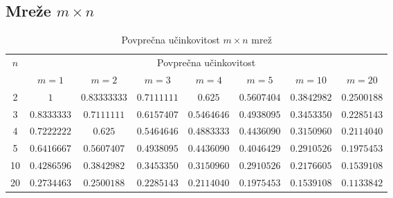\documentclass[a4paper, 16pt]{article}
\begin{document}
    \subsection{Mreže $m \times n$}
    

    \begin{table}[!h]
        \centering
        \begin{tabular}{c|c|c|c|c|c|c|c}
            \multirow{2}{*}{$n$} & 
            \multicolumn{7}{c}{Povprečna učinkovitost}\\
               & $m=1$       & $m=2$           & $m=3$           & $m=4$         & $m = 5$     & $m = 10$    & $m=20$     \\ \hline
            2  & $1$         & $0.83333333$ & $0.7111111$ & $0.625$       & $0.5607404$ & $0.3842982$ & $0.2500188$\\
            3  & $0.8333333$ & $0.7111111$  & $0.6157407$ & $0.5464646$   & $0.4938095$ & $0.3453350$ & $0.2285143$\\
            4  & $0.7222222$ & $0.625$      & $0.5464646$ & $0.4883333$   & $0.4436090$ & $0.3150960$ & $0.2114040$\\
            5  & $0.6416667$ & $0.5607407$  & $0.4938095$ & $0.4436090$   & $0.4046429$ & $0.2910526$ & $0.1975453$\\
            10 & $0.4286596$ & $0.3842982$  & $0.3453350$ & $0.3150960$   & $0.2910526$ & $0.2176605$ & $0.1539108$\\
            20 & $0.2734463$ & $0.2500188$  & $0.2285143$ & $0.2114040$   & $0.1975453$ & $0.1539108$ & $0.1133842$\\

        \end{tabular}
        \caption{Povprečna učinkovitost $m \times n$ mrež}
        \label{table: 1}
    \end{table}
\end{document}
